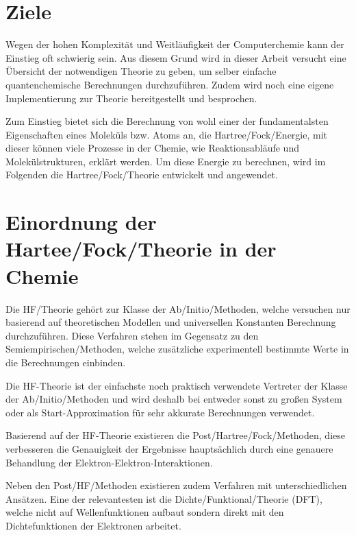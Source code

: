 \section{Ziele}
Wegen der hohen Komplexität und Weitläufigkeit der Computerchemie
kann der Einstieg oft schwierig sein. Aus diesem Grund wird
in dieser Arbeit versucht eine Übersicht der notwendigen Theorie zu geben,
um selber einfache quantenchemische Berechnungen durchzuführen.
Zudem wird noch eine eigene Implementierung
zur Theorie bereitgestellt und besprochen.

Zum Einstieg bietet sich die Berechnung von wohl einer der fundamentalsten Eigenschaften 
eines Moleküls bzw. Atoms an, die Hartree\-/Fock\-/Energie, 
mit dieser können viele Prozesse in der Chemie,
wie Reaktionsabläufe und Molekülstrukturen, erklärt werden.
Um diese Energie zu berechnen, wird im Folgenden
die Hartree\-/Fock\-/Theorie entwickelt und angewendet.


\section{Einordnung der Hartee\-/Fock\-/Theorie in der Chemie} \label{posthf}
Die HF\-/Theorie gehört zur Klasse der Ab\-/Initio\-/Methoden,
welche versuchen nur basierend auf theoretischen Modellen und
universellen Konstanten Berechnung durchzuführen.
Diese Verfahren stehen im Gegensatz zu den Semiempirischen\-/Methoden,
welche zusätzliche experimentell bestimmte Werte in die Berechnungen einbinden.

Die HF-Theorie ist der einfachste noch praktisch verwendete Vertreter
der Klasse der Ab\-/Initio\-/Methoden
und wird deshalb bei entweder sonst zu großen System oder
als Start-Approximation für sehr akkurate Berechnungen verwendet.
\cite[S. 433]{structure_2013}

Basierend auf der HF-Theorie existieren die Post\-/Hartree\-/Fock\-/Methoden,
diese verbesseren die Genauigkeit der Ergebnisse hauptsächlich
durch eine genauere Behandlung der Elektron-Elektron-Interaktionen.

Neben den Post\-/HF\-/Methoden existieren zudem Verfahren
mit unterschiedlichen Ansätzen. Eine der relevantesten ist
die Dichte\-/Funktional\-/Theorie (DFT), welche nicht auf
Wellenfunktionen aufbaut sondern direkt mit den
Dichtefunktionen der Elektronen arbeitet.